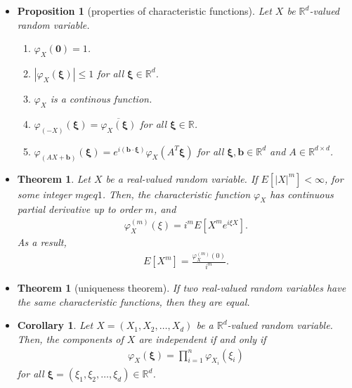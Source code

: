 \documentclass[10pt]{article}
\newtheorem{theorem}[lemma]{Theorem}
\newtheorem{proposition}[lemma]{Proposition}
\newtheorem{corollary}[lemma]{Corollary}
\numberwithin{lemma}{section}
\newcommand{\ve}[1]{\mathbf{#1}}
\newcommand{\ves}[1]{\boldsymbol{#1}}
\newcommand{\Real}{\mathbb{R}}
\begin{document}
\begin{itemize}
  \item \begin{proposition}[properties of characteristic functions]
    Let $X$ be $\Real^d$-valued random variable.
    \begin{enumerate}
      \item $\varphi_X(\ve{0}) = 1$.
      \item $|\varphi_X(\ves{\xi})| \leq 1$ for all $\ves{\xi} \in \Real^d$.
      \item $\varphi_X$ is a continous function.
      \item $\varphi_{(-X)}(\ves{\xi}) = \overline{\varphi_X(\ves{\xi})}$ for all $\ves{\xi} \in \Real$.
      \item $\varphi_{(AX+\ves{b})}(\ves{\xi}) = e^{i(\ve{b}\cdot \ves{\xi})}\varphi_X(A^T\ves{\xi})$ for all $\ves{\xi}, \ves{b} \in \Real^d$ and $A \in \Real^{d\times d}$. 
    \end{enumerate}
  \end{proposition}

  \item \begin{theorem}
    Let $X$ be a real-valued random variable. If $E[|X|^m] < \infty$, for some integer $m geq 1$. Then, the characteristic function $\varphi_X$ has continuous partial derivative up to order $m$, and
    \begin{align*}
      \varphi_X^{(m)}(\xi) = i^m E[X^m e^{i\xi X}].
    \end{align*}
    As a result,
    \begin{align*}
      E[X^m] = \frac{\varphi_X^{(m)}(0)}{i^m}.
    \end{align*}
  \end{theorem}

  \item \begin{theorem}[uniqueness theorem]
    If two real-valued random variables have the same characteristic functions, then they are equal.
  \end{theorem}

  \item \begin{corollary}
    Let $X = (X_1, X_2, \dotsc, X_d)$ be a $\Real^d$-valued random variable. Then, the components of $X$ are independent if and only if
    \begin{align*}
      \varphi_X(\ves{\xi}) = \prod_{i=1}^n \varphi_{X_i}(\xi_i)
    \end{align*}
    for all $\ves{\xi} = (\xi_1, \xi_2, \dotsc, \xi_d) \in \Real^d$.
  \end{corollary}
  

\end{itemize}
\end{document}
